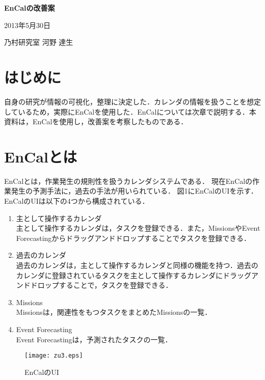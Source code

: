 \documentclass[fleqn, 14pt]{extarticlej}
\begin{document}
\begin{center}
{\Large {\bf EnCalの改善案}}

\end{center}
\begin{flushright}
2013年5月30日

乃村研究室 河野 達生
\end{flushright}


\section{はじめに}
自身の研究が情報の可視化，整理に決定した．カレンダの情報を扱うことを想定しているため，実際にEnCalを使用した．EnCalについては次章で説明する．本資料は，EnCalを使用し，改善案を考察したものである．

\section{EnCalとは}
EnCalとは，作業発生の規則性を扱うカレンダシステムである\cite{book1}．
現在EnCalの作業発生の予測手法に，過去の手法が用いられている\cite{book2}．
図1にEnCalのUIを示す．EnCalのUIは以下の4つから構成されている．

\begin{enumerate}
	\item 主として操作するカレンダ\\
	主として操作するカレンダは，タスクを登録できる．また，MissionsやEvent Forecastingからドラッグアンドドロップすることでタスクを登録できる．
	\item 過去のカレンダ\\
	過去のカレンダは，主として操作するカレンダと同様の機能を持つ．過去のカレンダに登録されているタスクを主として操作するカレンダにドラッグアンドドロップすることで，タスクを登録できる．
	\item Missions\\
	Missionsは，関連性をもつタスクをまとめたMissionsの一覧．
	\item Event Forecasting\\
	Event Forecastingは，予測されたタスクの一覧．

\end{enumerate}

\begin{figure}[h]
  \begin{center}
    \texttt{[image: zu3.eps]}
    \caption{EnCalのUI}
  \end{center}
\end{figure}
\end{document}
